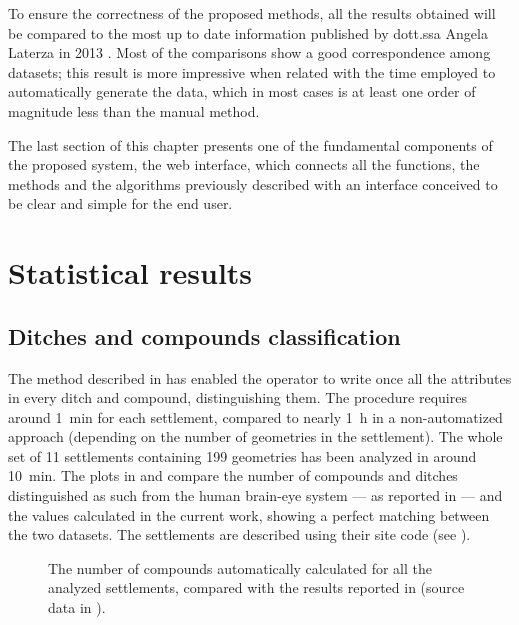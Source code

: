     To ensure the correctness of the proposed methods, all the results obtained will be compared to the most up to date information published by dott.ssa Angela Laterza in 2013 \cite{laterza}. Most of the comparisons show a good correspondence among datasets; this result is more impressive when related with the time employed to automatically generate the data, which in most cases is at least one order of magnitude less than the manual method.
    
    The last section of this chapter presents one of the fundamental components of the proposed system, the web interface, which connects all the functions, the methods and the algorithms previously described with an interface conceived to be clear and simple for the end user.

    \section{Statistical results}
        \subsection{Ditches and compounds classification}
            The method described in  has enabled the operator to write once all the attributes in every ditch and compound, distinguishing them. The procedure requires around \SI{1}{\minute} for each settlement, compared to nearly \SI{1}{\hour} in a non-automatized approach (depending on the number of geometries in the settlement). The whole set of 11 settlements containing 199 geometries has been analyzed in around \SI{10}{\minute}. The plots in  and  compare the number of compounds and ditches distinguished as such from the human brain-eye system --- as reported in \cite{laterza} --- and the values calculated in the current work, showing a perfect matching between the two datasets. The settlements are described using their site code (see ).

            \begin{figure}[H]
                \centering
                \begin{tikzpicture}
                    
                \end{tikzpicture}
                \caption[The number of compounds in \cite{laterza} compared to the results of the proposed method]{The number of compounds automatically calculated for all the analyzed settlements, compared with the results reported in \cite{laterza} (source data in ).}
                \label{fig:graph-num-compound}
            \end{figure}

